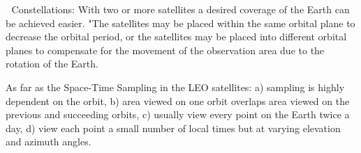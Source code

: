   Constellations: With two or more satellites a desired coverage of the Earth can be achieved easier. "The satellites may be placed within the same orbital plane to decrease the orbital period, or the satellites may be placed into different orbital planes to compensate for the movement of the observation area due to the rotation of the Earth.


As far as the Space-Time Sampling in the LEO satellites: a) sampling is highly dependent on the orbit, b) area viewed on one orbit overlaps area viewed on the previous and succeeding orbits, c) usually view every point on the Earth twice a day, d) view each point a small number of local times but at varying elevation and azimuth angles.


%

